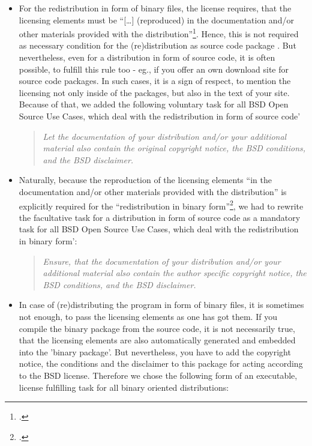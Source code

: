 \begin{itemize}
\item For the redistribution in form of binary files, the license requires,
that the licensing elements must be \enquote{[\ldots] (reproduced) in the documentation
and/or other materials provided with the
distribution}\footcite[cf.][\nopage wp]{BsdLicense2Clause}. Hence, this is
not required as necessary condition for the (re)distribution as source code
package . But nevertheless, even for a distribution in form of source code, it
is often possible, to fulfill this rule too - eg., if you offer an own download
site for source code packages. In such cases, it is a sign of respect, to
mention the licensing not only inside of the packages, but also in the text of
your site. Because of that, we added the following voluntary task for all BSD
Open Source Use Cases, which deal with the redistribution in form of source
code'

\begin{quote}\textit{Let the documentation of your distribution and/or your
additional material also contain the original copyright notice, the BSD
conditions, and the BSD disclaimer.}\end{quote}

\item Naturally, because the reproduction of the licensing elements \enquote{in
the documentation and/or other materials provided with the distribution}
is explicitly required for the \enquote{redistribution in binary
form}\footcite[cf.][\nopage wp]{BsdLicense2Clause}, we had to rewrite the
facultative task for a distribution in form of source code as a mandatory task
for all BSD Open Source Use Cases, which deal with the redistribution in binary
form':

\begin{quote}\textit{Ensure, that the documentation of your distribution and/or
your additional material also contain the author specific copyright notice, the
BSD conditions, and the BSD disclaimer.}\end{quote}

\item In case of (re)distributing the program in form of binary files, it is
sometimes not enough, to pass the licensing elements as one has got them. If you
compile the binary package from the source code, it is not necessarily true,
that the licensing elements are also automatically generated and embedded into
the 'binary package'. But nevertheless, you have to add the copyright notice,
the conditions and the disclaimer to this package for acting according to the
BSD license. Therefore we chose the following form of an executable, license
fulfilling task for all binary oriented distributions:


\end{itemize}
